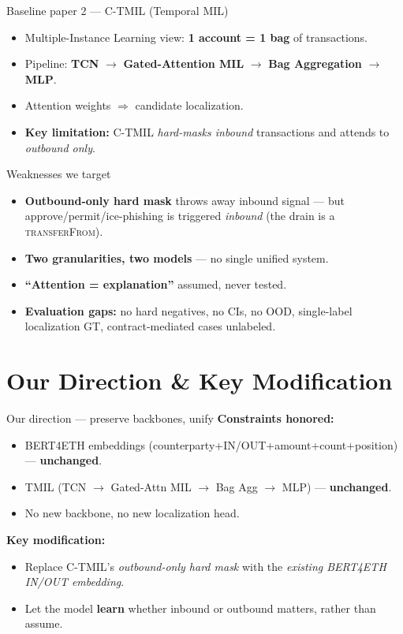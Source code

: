 \documentclass[aspectratio=169,10pt]{beamer}
\begin{document}
\begin{frame}{Baseline paper 2 --- C-TMIL (Temporal MIL)}
\begin{itemize}
\item Multiple-Instance Learning view: \textbf{1 account = 1 bag} of transactions.
\item Pipeline: \textbf{TCN} $\to$ \textbf{Gated-Attention MIL} $\to$ \textbf{Bag Aggregation} $\to$ \textbf{MLP}.
\item Attention weights $\Rightarrow$ candidate localization.
\item \textbf{Key limitation:} C-TMIL \emph{hard-masks inbound} transactions and attends to \emph{outbound only}.
\end{itemize}
\end{frame}

\begin{frame}{Weaknesses we target}
\begin{itemize}
\item \textbf{Outbound-only hard mask} throws away inbound signal --- but approve/permit/ice-phishing is triggered \emph{inbound} (the drain is a \textsc{transferFrom}).
\item \textbf{Two granularities, two models} --- no single unified system.
\item \textbf{``Attention = explanation''} assumed, never tested.
\item \textbf{Evaluation gaps:} no hard negatives, no CIs, no OOD, single-label localization GT, contract-mediated cases unlabeled.
\end{itemize}
\end{frame}

\section{Our Direction \& Key Modification}
\begin{frame}{Our direction --- preserve backbones, unify}
\textbf{Constraints honored:}
\begin{itemize}
\item BERT4ETH embeddings (counterparty+IN/OUT+amount+count+position) --- \textbf{unchanged}.
\item TMIL (TCN $\to$ Gated-Attn MIL $\to$ Bag Agg $\to$ MLP) --- \textbf{unchanged}.
\item No new backbone, no new localization head.
\end{itemize}
\vfill
\textbf{Key modification:}
\begin{itemize}
\item Replace C-TMIL's \emph{outbound-only hard mask} with the \emph{existing BERT4ETH IN/OUT embedding}.
\item Let the model \textbf{learn} whether inbound or outbound matters, rather than assume.
\end{itemize}
\end{frame}
\end{document}
